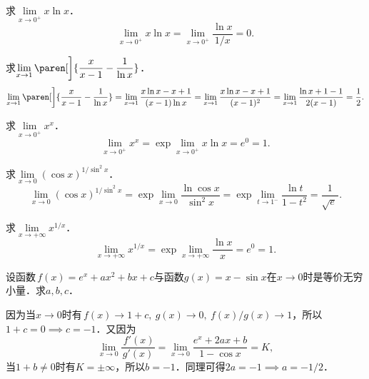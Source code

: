 \begin{example*}
  求\(\!\lim\limits_{x\to0^+} \!x \ln x\)．
  \begin{equation*}
    \lim_{x\to0^+} \!x \ln x
    = \lim_{x\to0^+\!} \frac{\ln x}{1/x}
    = 0.
  \end{equation*}
\end{example*}

\begin{example*}
  求\(\lim\limits_{x\to1}{}\paren[\bigg]{\dfrac{x}{x-1} - \dfrac1{\ln x}}\)．
  \begin{equation*}
    \lim_{x\to1}{}\paren[\bigg]{\dfrac{x}{x-1} - \dfrac1{\ln x}}
    = \lim_{x\to1} \frac{x \ln x - x + 1}{(x-1) \ln x}
    = \lim_{x\to1} \frac{x \ln x - x + 1}{(x-1)^2}
    = \lim_{x\to1} \frac{\ln x + 1 - 1}{2(x-1)}
    = \frac12.
  \end{equation*}
\end{example*}

\begin{example*}
  求\(\!\lim\limits_{x\to0^+\!} x^x\)．
  \begin{equation*}
    \lim_{x\to0^+\!} x^x
    = \exp \lim_{x\to0^+\!} x \ln x
    = e^0 = 1.
  \end{equation*}
\end{example*}

\begin{example*}
  求\(\lim\limits_{x\to0} {}(\cos x)^{1/\!\sin^2 x}\)．
  \begin{equation*}
    \lim_{x\to0} {}(\cos x)^{1/\!\sin^2 x}
    = \exp \lim_{x\to0} \frac{\ln \cos x}{\sin^2 x}
    = \exp \lim_{t\to1^-\!} \frac{\ln t}{1-t^2}
    = \frac1{\!\sqrt e\,}.
  \end{equation*}
\end{example*}

\begin{example*}
  求\(\!\lim\limits_{x\to+\infty\!} x^{1/x}\)．
  \begin{equation*}
    \lim_{x\to+\infty\!} x^{1/x}
    = \exp \!\lim_{x\to+\infty\!} \!\frac{\ln x}{x}
    = e^0 = 1.
  \end{equation*}
\end{example*}

\begin{example*}
  设函数\(\,f(x) = e^x + ax^2 + bx + c\)与函数\(g(x) = x - \sin x\)在\(x \to 0\)时是等价无穷小量．求\(a,b,c\)．

  \begin{remark}
    因为当\(x \to 0\)时有\(\,f(x) \to 1 + c,\ g(x) \to 0,\ f(x)/g(x) \to 1\)，所以\(1 + c = 0 \implies c = -1\)．又因为
    \begin{equation*}
      \lim_{x\to0} \frac{\,f'(x)}{g'(x)}
      = \lim_{x\to0} \frac{e^x + 2ax + b}{1-\cos x}
      = K,
    \end{equation*}
    当\(1 + b \ne 0\)时有\(K = \pm\infty\)，所以\(b = -1\)．同理可得\(2a = -1 \implies a = -1/2\)．
  \end{remark}
\end{example*}

